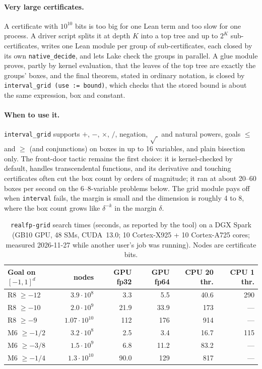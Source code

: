\documentclass[11pt]{article}
\theoremstyle{definition}
\theoremstyle{remark}
\newcommand{\lean}[1]{\texttt{#1}}
\begin{document}
\paragraph{Very large certificates.} A certificate with $10^{10}$ bits is too
big for one Lean term and too slow for one process. A driver script splits it
at depth $K$ into a top tree and up to $2^K$ sub-certificates, writes one
Lean module per group of sub-certificates, each closed by its own
\lean{native\_decide}, and lets Lake check the groups in parallel. A glue
module proves, partly by kernel evaluation, that the leaves of the top tree
are exactly the groups' boxes, and the final theorem, stated in ordinary
notation, is closed by \lean{interval\_grid (use := bound)}, which checks
that the stored bound is about the same expression, box and constant.

\paragraph{When to use it.} \lean{interval\_grid} supports $+$, $-$, $\times$,
$/$, negation, $\sqrt{\ }$ and natural powers, goals $\le$ and $\ge$ (and
conjunctions) on boxes in up to 16 variables, and plain bisection only.
The front-door tactic remains the first choice: it is kernel-checked by
default, handles transcendental functions, and its derivative and touching
certificates often cut the box count by orders of magnitude; it ran at about
20--60 boxes per second on the 6--8-variable problems below. The grid module
pays off when \lean{interval} fails, the margin is small and the dimension is
roughly 4 to 8, where the box count grows like $\delta^{-k}$ in the margin
$\delta$.

\begin{table}[t]
\centering\small
\caption{\lean{realfp-grid} search times (seconds, as reported by the tool)
on a DGX Spark (GB10 GPU, 48 SMs, CUDA~13.0; 10 Cortex-X925 + 10
Cortex-A725 cores; measured 2026-11-27 while another user's job was
running). Nodes are certificate bits.}
\label{tab:grid}
\begin{tabular}{@{}lrrrrr@{}}
\toprule
Goal on $[-1,1]^d$ & nodes & GPU fp32 & GPU fp64 & CPU 20 thr. & CPU 1 thr.\\
\midrule
R8 $\ge -12$  & $3.9\cdot10^8$  & 3.3  & 5.5  & 40.6 & 290 \\
R8 $\ge -10$  & $2.0\cdot10^9$  & 21.9 & 33.9 & 173  & --- \\
R8 $\ge -9$   & $1.07\cdot10^{10}$ & 112 & 176 & 914 & --- \\
M6 $\ge -1/2$ & $3.2\cdot10^8$  & 2.5  & 3.4  & 16.7 & 115 \\
M6 $\ge -3/8$ & $1.5\cdot10^9$  & 6.8  & 11.2 & 83.2 & --- \\
M6 $\ge -1/4$ & $1.3\cdot10^{10}$ & 90.0 & 129 & 817 & --- \\
\bottomrule
\end{tabular}
\end{table}
\end{document}
